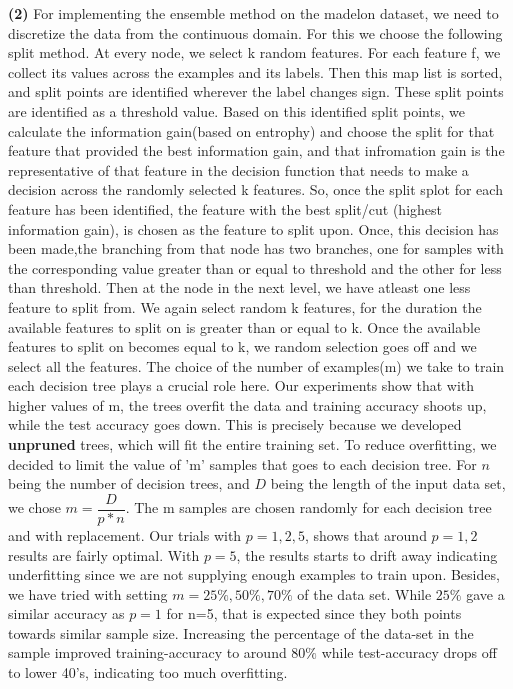 \documentclass{article}
\renewcommand\part[1]{\vspace{.10in}\textbf{(#1)}}
\begin{document}
  \part{2} For implementing the ensemble method on the madelon dataset, we need to discretize the data from the continuous domain. For this we choose the following split method. At every node, we select k random features. For each feature f, we collect its values across the examples and its labels. Then this map list is sorted, and split points are identified wherever the label changes sign. These split points are identified as a threshold value. Based on this identified split points, we calculate the information gain(based on entrophy) and choose the split for that feature that provided the best information gain, and that infromation gain is the representative of that feature in the decision function that needs to make a decision across the randomly selected k features.  So, once the split splot for each feature has been identified, the feature with the best split/cut (highest information gain), is chosen as the feature to split upon. Once, this decision  has been made,the branching from that node has two branches, one for samples with the corresponding value greater than or equal to threshold and the other for less than threshold. Then at the node in the next level, we have atleast one less feature to split from. We again select random k features, for the duration the available features to split on is greater than or equal to k. Once the available features to split on becomes equal to k, we random selection goes off and we select all the features. \newline
  The choice of the number of examples(m) we take to train each decision tree plays a crucial role here. Our experiments show that with higher values of m, the trees overfit the data and training accuracy shoots up, while the test accuracy goes down. This is precisely because we developed \textbf {unpruned} trees, which will fit the entire training set. To reduce overfitting, we decided to limit the value of 'm' samples that goes to each decision tree. For $n$ being the number of decision trees, and $D$ being the length of the input data set, we chose $m = \dfrac{D}{p*n}$. The m samples are chosen randomly for each decision tree and with replacement. Our trials with $p=1,2,5$, shows that around $p=1,2$ results are fairly optimal. With $p=5$, the results starts to drift away indicating underfitting since we are not supplying enough examples to train upon. Besides, we have tried with setting $m={25\%, 50\%, 70\%}$ of the data set. While $25\%$ gave a similar accuracy as $p=1$ for n=5, that is expected since they both points towards similar sample size. Increasing the percentage of the data-set in the sample improved training-accuracy to around $80\%$ while test-accuracy drops off to lower 40's, indicating too much overfitting. \newline
\end{document}

